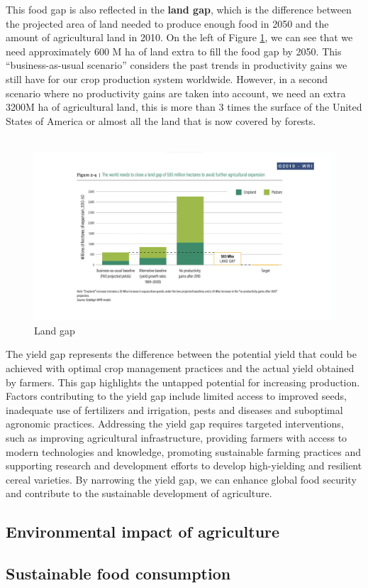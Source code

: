 \documentclass[../summary.tex]{subfiles}
\begin{document}
	This food gap is also reflected in the \textbf{land gap}, which is the difference between the projected area of land needed to produce enough food in 2050 and the amount of agricultural land in 2010. On the left of Figure \ref{fig:land_gap}, we can see that we need approximately 600 M ha of land extra to fill the food gap by 2050. This “business-as-usual scenario” considers the past trends in productivity gains we still have for our crop production system worldwide. However, in a second scenario where no productivity gains are taken into account, we need an extra 3200M ha of agricultural land, this is more than 3 times the surface of the United States of America or almost all the land that is now covered by forests.
	\\\\
	\begin{figure}[htbp]
		\centering
		\includegraphics[width=1\linewidth]{images/6-land-gap.png}
		\caption{Land gap}
		\label{fig:land_gap}
	\end{figure}
	
	The yield gap represents the difference between the potential yield that could be achieved with optimal crop management practices and the actual yield obtained by farmers. This gap highlights the untapped potential for increasing production. Factors contributing to the yield gap include limited access to improved seeds, inadequate use of fertilizers and irrigation, pests and diseases and suboptimal agronomic practices. Addressing the yield gap requires targeted interventions, such as improving agricultural infrastructure, providing farmers with access to modern technologies and knowledge, promoting sustainable farming practices and supporting research and development efforts to develop high-yielding and resilient cereal varieties. By narrowing the yield gap, we can enhance global food security and contribute to the sustainable development of agriculture.
	
	\subsection{Environmental impact of agriculture}
	
	\subsection{Sustainable food consumption}
	
\end{document}
